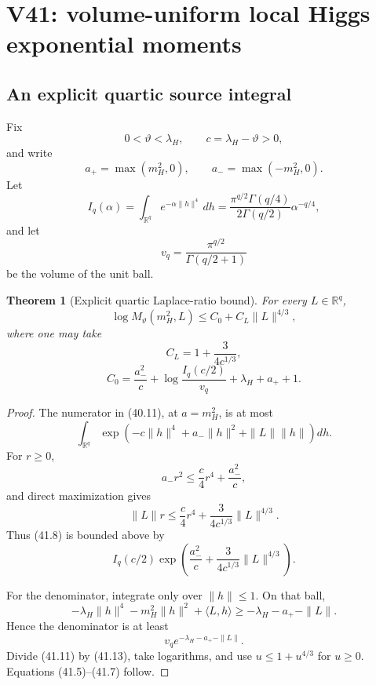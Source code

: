 \documentclass[11pt]{article}
\newtheorem{theorem}{Theorem}[section]
\theoremstyle{remark}
\begin{document}
\section{V41: volume-uniform local Higgs exponential moments}
\label{sec:v17v41}

\subsection{An explicit quartic source integral}

Fix
\[
 0<\vartheta<\lambda_H,
 \qquad c=\lambda_H-\vartheta>0,                   \tag{41.1}
\]
and write
\[
 a_+=\max(m_H^2,0),
 \qquad a_-=\max(-m_H^2,0).                        \tag{41.2}
\]
Let
\[
 I_q(\alpha)=\int_{\mathbb R^q}e^{-\alpha\|h\|^4}\,dh
 =\frac{\pi^{q/2}\Gamma(q/4)}{2\Gamma(q/2)}
 \alpha^{-q/4},                                    \tag{41.3}
\]
and let
\[
 v_q=\frac{\pi^{q/2}}{\Gamma(q/2+1)}              \tag{41.4}
\]
be the volume of the unit ball.

\begin{theorem}[Explicit quartic Laplace-ratio bound]
\label{thm:v17v41-ratio}
For every \(L\in\mathbb R^q\),
\[
 \boxed{
 \log M_\vartheta(m_H^2,L)
 \leq C_0+C_L\|L\|^{4/3},}                        \tag{41.5}
\]
where one may take
\[
 C_L=1+\frac{3}{4c^{1/3}},                         \tag{41.6}
\]
\[
 C_0=\frac{a_-^2}{c}
 +\log\frac{I_q(c/2)}{v_q}
 +\lambda_H+a_++1.                                \tag{41.7}
\]
\end{theorem}

\begin{proof}
The numerator in (40.11), at \(a=m_H^2\), is at most
\[
 \int_{\mathbb R^q}
 \exp\left(-c\|h\|^4+a_-\|h\|^2+\|L\|\|h\|\right)dh.         \tag{41.8}
\]
For \(r\geq0\),
\[
 a_-r^2\leq\frac c4r^4+\frac{a_-^2}{c},           \tag{41.9}
\]
and direct maximization gives
\[
 \|L\|r
 \leq\frac c4r^4+
 \frac{3}{4c^{1/3}}\|L\|^{4/3}.                  \tag{41.10}
\]
Thus (41.8) is bounded above by
\[
 I_q(c/2)\exp\left(
 \frac{a_-^2}{c}
 +\frac{3}{4c^{1/3}}\|L\|^{4/3}
 \right).                                         \tag{41.11}
\]

For the denominator, integrate only over \(\|h\|\leq1\).  On that
ball,
\[
 -\lambda_H\|h\|^4-m_H^2\|h\|^2+\langle L,h\rangle
 \geq-\lambda_H-a_+-\|L\|.                       \tag{41.12}
\]
Hence the denominator is at least
\[
 v_qe^{-\lambda_H-a_+-\|L\|}.                     \tag{41.13}
\]
Divide (41.11) by (41.13), take logarithms, and use
\(u\leq1+u^{4/3}\) for \(u\geq0\).  Equations
(41.5)--(41.7) follow.
\end{proof}
\end{document}
